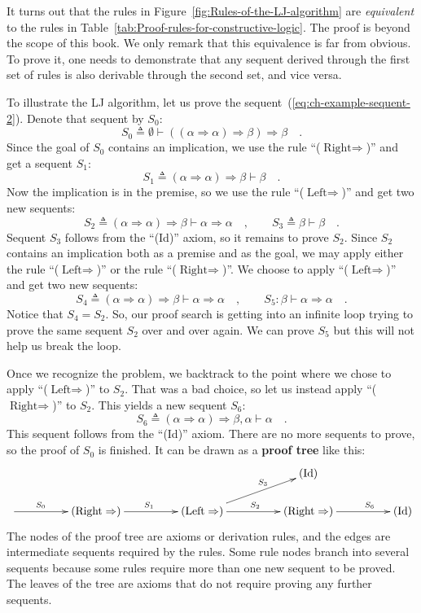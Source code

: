 It turns out that the rules in Figure~\ref{fig:Rules-of-the-LJ-algorithm}
are \emph{equivalent} to the rules in Table~\ref{tab:Proof-rules-for-constructive-logic}.
The proof is beyond the scope of this book. We only remark that this
equivalence is far from obvious. To prove it, one needs to demonstrate
that any sequent derived through the first set of rules is also derivable
through the second set, and vice versa.

To illustrate the LJ algorithm, let us prove the sequent~(\ref{eq:ch-example-sequent-2}).
Denote that sequent by $S_{0}$:
\[
S_{0}\triangleq\emptyset\vdash\left(\left(\alpha\Rightarrow\alpha\right)\Rightarrow\beta\right)\Rightarrow\beta\quad.
\]
 Since the goal of $S_{0}$ contains an implication, we use the rule
\textsf{``}($\text{Right}\Rightarrow$)\textsf{''} and get a sequent $S_{1}$:
\[
S_{1}\triangleq\left(\alpha\Rightarrow\alpha\right)\Rightarrow\beta\vdash\beta\quad.
\]
Now the implication is in the premise, so we use the rule \textsf{``}($\text{Left}\Rightarrow$)\textsf{''}
and get two new sequents:
\[
S_{2}\triangleq\left(\alpha\Rightarrow\alpha\right)\Rightarrow\beta\vdash\alpha\Rightarrow\alpha\quad,\quad\quad S_{3}\triangleq\beta\vdash\beta\quad.
\]
Sequent $S_{3}$ follows from the \textsf{``}(Id)\textsf{''} axiom, so it remains
to prove $S_{2}$. Since $S_{2}$ contains an implication both as
a premise and as the goal, we may apply either the rule \textsf{``}($\text{Left}\Rightarrow$)\textsf{''}
or the rule \textsf{``}($\text{Right}\Rightarrow$)\textsf{''}. We choose to apply
\textsf{``}($\text{Left}\Rightarrow$)\textsf{''} and get two new sequents:
\[
S_{4}\triangleq\left(\alpha\Rightarrow\alpha\right)\Rightarrow\beta\vdash\alpha\Rightarrow\alpha\quad,\quad\quad S_{5}:\beta\vdash\alpha\Rightarrow\alpha\quad.
\]
Notice that $S_{4}=S_{2}$. So, our proof search is getting into an
infinite loop trying to prove the same sequent $S_{2}$ over and over
again. We can prove $S_{5}$ but this will not help us break the loop.

Once we recognize the problem, we backtrack to the point where we
chose to apply \textsf{``}($\text{Left}\Rightarrow$)\textsf{''} to $S_{2}$. That
was a bad choice, so let us instead apply \textsf{``}($\text{Right}\Rightarrow$)\textsf{''}
to $S_{2}$. This yields a new sequent $S_{6}$:
\[
S_{6}\triangleq\left(\alpha\Rightarrow\alpha\right)\Rightarrow\beta,\alpha\vdash\alpha\quad.
\]
This sequent follows from the \textsf{``}(Id)\textsf{''} axiom. There are no more
sequents to prove, so the proof of $S_{0}$ is finished. It can be
drawn as a \textbf{proof tree} like this:
\[
\xymatrix{\xyScaleY{1.5pc}\xyScaleX{4pc} &  &  & (\text{Id})\\
\ar[r]\sp(0.35){S_{0}} & (\text{Right}\Rightarrow)\ar[r]\sp(0.5){S_{1}} & (\text{Left}\Rightarrow)\ar[r]\sp(0.5){S_{2}}\ar[ru]\sp(0.6){S_{3}} & (\text{Right}\Rightarrow)\ar[r]\sp(0.65){S_{6}} & (\text{Id})
}
\]
The nodes of the proof tree are axioms or derivation rules, and the
edges are intermediate sequents required by the rules. Some rule nodes
branch into several sequents because some rules require more than
one new sequent to be proved. The leaves of the tree are axioms that
do not require proving any further sequents. 


